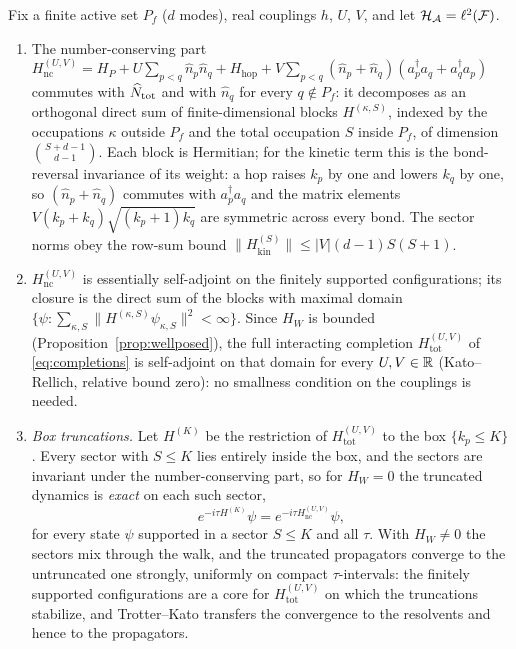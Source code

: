\begin{proposition}\label{prop:sector}
Fix a finite active set $P_{f}$ ($d$ modes), real couplings $h$, $U$, $V$, and let
$\mathcal{H}_{\mathcal{A}}=\ell^{2}(\mathcal{F})$.
\begin{enumerate}[leftmargin=1.6em]
\item The number-conserving part
$H_{\mathrm{nc}}^{(U,V)}=H_{P}+U\sum_{p<q}\hat n_{p}\hat n_{q}+H_{\mathrm{hop}}+V\sum_{p<q}
(\hat n_{p}+\hat n_{q})(a_{p}^{\dagger}a_{q}+a_{q}^{\dagger}a_{p})$
commutes with $\widehat{N}_{\mathrm{tot}}$ and with $\hat n_{q}$ for every $q\notin P_{f}$: it
decomposes as an orthogonal direct sum of finite-dimensional blocks $H^{(\kappa,S)}$, indexed
by the occupations $\kappa$ outside $P_{f}$ and the total occupation $S$ inside $P_{f}$, of
dimension $\binom{S+d-1}{d-1}$. Each block is Hermitian; for the kinetic term this is the
bond-reversal invariance of its weight: a hop raises $k_{p}$ by one and lowers $k_{q}$ by
one, so $(\hat n_{p}+\hat n_{q})$ commutes with $a_{p}^{\dagger}a_{q}$ and the matrix
elements $V(k_{p}+k_{q})\sqrt{(k_{p}+1)k_{q}}$ are symmetric across every bond. The sector
norms obey the row-sum bound
$\|H_{\mathrm{kin}}^{(S)}\|\leq|V|(d-1)S(S+1)$.
\item $H_{\mathrm{nc}}^{(U,V)}$ is essentially self-adjoint on the finitely supported
configurations; its closure is the direct sum of the blocks with maximal domain
$\{\psi:\sum_{\kappa,S}\|H^{(\kappa,S)}\psi_{\kappa,S}\|^{2}<\infty\}$. Since $H_{W}$ is
bounded (Proposition~\ref{prop:wellposed}), the full interacting completion
$H_{\mathrm{tot}}^{(U,V)}$ of \eqref{eq:completions} is self-adjoint on that domain for
every $U,V\in\mathbb{R}$ (Kato--Rellich, relative bound zero): no smallness condition on the
couplings is needed.
\item \emph{Box truncations.} Let $H^{(K)}$ be the restriction of
$H_{\mathrm{tot}}^{(U,V)}$ to the box $\{k_{p}\leq K\}$. Every sector with $S\leq K$ lies
entirely inside the box, and the sectors are invariant under the number-conserving part, so
for $H_{W}=0$ the truncated dynamics is \emph{exact} on each such sector,
\begin{equation*}
e^{-i\tau H^{(K)}}\psi=e^{-i\tau H_{\mathrm{nc}}^{(U,V)}}\psi ,
\end{equation*}
for every state $\psi$
supported in a sector $S\leq K$ and all $\tau$. With $H_{W}\neq0$ the sectors mix through the
walk, and the truncated propagators converge to the untruncated one strongly, uniformly on
compact $\tau$-intervals: the finitely supported configurations are a core for
$H_{\mathrm{tot}}^{(U,V)}$ on which the truncations stabilize, and Trotter--Kato transfers
the convergence to the resolvents and hence to the propagators.
\end{enumerate}
\end{proposition}

